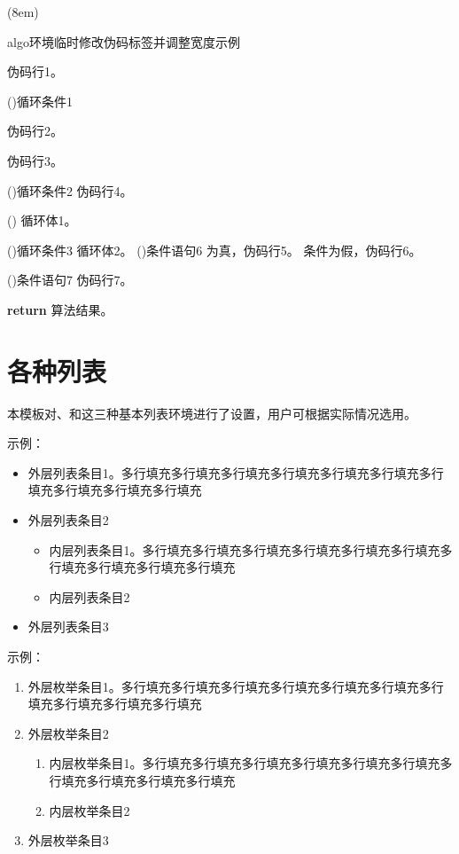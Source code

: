 \documentclass[doctor, vlined]{DissertUESTC}
\begin{document}
	\begin{algo}[!h](8em)
		\renewcommand{\algorithmcfname}{过程}  %
		\caption{algo环境临时修改伪码标签并调整宽度示例} \label{alg: algo环境修改伪码标签并调整宽度示例}
		伪码行1。
		
		\For(){循环条件1}{
			伪码行2。
			
			伪码行3。
			
			\DoWhile(){循环条件2}{
				伪码行4。
			}
			
			\Loop(){
				循环体1。
			}
			
			\Repeat(){循环条件3}{
				循环体2。
			}
			\eIf(){条件语句6}{
				为真，伪码行5。
			}{
				条件为假，伪码行6。
			}
			
			\If(){条件语句7}{
				伪码行7。
			}
		}
		\textbf{return} 算法结果。
	\end{algo}

	\clearpage
	\section{各种列表}

	本模板对、和这三种基本列表环境进行了设置，用户可根据实际情况选用。

	示例：

	\begin{itemize}
		\item 外层列表条目1。多行填充多行填充多行填充多行填充多行填充多行填充多行填充多行填充多行填充多行填充
		\item 外层列表条目2
		\begin{itemize}
			\item 内层列表条目1。多行填充多行填充多行填充多行填充多行填充多行填充多行填充多行填充多行填充多行填充
			\item 内层列表条目2
		\end{itemize}
		\item 外层列表条目3
	\end{itemize}

	\null

	示例：

	\begin{enumerate}
		\item 外层枚举条目1。多行填充多行填充多行填充多行填充多行填充多行填充多行填充多行填充多行填充多行填充
		\item 外层枚举条目2
		\begin{enumerate}
			\item 内层枚举条目1。多行填充多行填充多行填充多行填充多行填充多行填充多行填充多行填充多行填充多行填充
			\item 内层枚举条目2
		\end{enumerate}
		\item 外层枚举条目3
	\end{enumerate}
\end{document}
